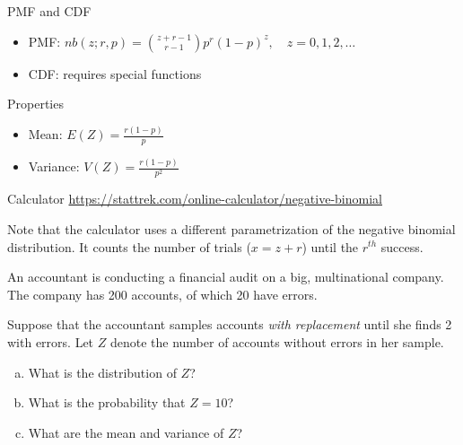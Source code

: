 \begin{frame}
  \begin{block}{PMF and CDF}
    \begin{itemize}
    \item PMF: $nb(z;r,p)=\binom{z+r-1}{r-1}p^{r}(1-p)^z, \quad z=0,1,2,\ldots$
    \item CDF: requires special functions
    \end{itemize}
  \end{block}


  \begin{block}{Properties}
    \begin{itemize}
    \item Mean: $E(Z)=\frac{r(1-p)}{p}$
      
    \item Variance: $V(Z)=\frac{r(1-p)}{p^2}$
      
    \end{itemize}
  \end{block}
  
  
\end{frame}

\begin{frame}

\begin{block}{Calculator}
  \url{https://stattrek.com/online-calculator/negative-binomial}
  
  \medskip
  
  Note that the calculator uses a different parametrization of the negative binomial distribution. It counts the number of trials ($x=z + r$) until the $r^{th}$ success.
  \end{block}
  
\end{frame}

\begin{frame}

  \begin{block}{\example}

    An accountant is conducting a financial audit on a big, multinational company. The company has 200 accounts, of which 20 have errors. 

    \bigskip
    Suppose that the accountant samples accounts \textit{with replacement} until she finds 2 with errors. Let $Z$ denote the number of accounts without errors in her sample.
    \begin{enumerate}[a)]
    \item What is the distribution of $Z$?
    \item What is the probability that $Z=10$?
    \item What are the mean and variance of $Z$?
    \end{enumerate}
  \end{block}
\end{frame}

